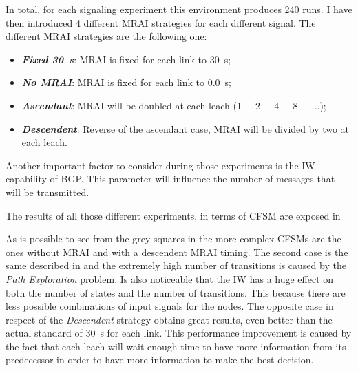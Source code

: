 \begin{table}[h]
	
	\caption{Fabrikant experiments environment}
	\label{tbl:fabrikant_environment}
\end{table}

In total, for each signaling experiment this environment produces \num{240} runs.
I have then introduced \num{4} different \ac{MRAI} strategies for each different
signal.
The different \ac{MRAI} strategies are the following one:
\begin{itemize}
	\item \textbf{\textit{Fixed \SI{30}{\second}}}: \ac{MRAI} is fixed for each link to \SI{30}{\second};
	\item \textbf{\textit{No \ac{MRAI}}}: \ac{MRAI} is fixed for each link to \SI{0.0}{\second};
	\item \textbf{\textit{Ascendant}}: \ac{MRAI} will be doubled at each leach (1 − 2 − 4 − 8 − ...);
	\item \textbf{\textit{Descendent}}: Reverse of the ascendant case, \ac{MRAI} will be divided by two at each leach.
\end{itemize}

Another important factor to consider during those experiments is the \ac{IW}
capability of \ac{BGP}.
This parameter will influence the number of messages
that will be transmitted.

The results of all those different experiments, in terms of \ac{CFSM} are
exposed in 

\begin{table}[h]
	
	\caption{Fabrikant \ac{CFSM}s results, $|S|$ is the dimension of the states set
		$|T|$ is the dimension of the transitions set, The worst results for each
		category are colored in gray, the topology contains \num{3} rings, as
		}
	\label{tbl:fabrikant_cfsm}
\end{table}

As is possible to see from the grey squares in  the more
complex \ac{CFSM}s are the ones without \ac{MRAI} and with a descendent \ac{MRAI}
timing.
The second case is the same described in \cite{fabrikant2011there} and the extremely
high number of transitions is caused by the \textit{Path Exploration} problem.
Is also noticeable that the \ac{IW} has a huge effect on both the number
of states and the number of transitions.
This because there are less possible combinations of input signals for the nodes.
The opposite case in respect of the \textit{Descendent} strategy obtains
great results, even better than the actual standard of \SI{30}{\second} for
each link.
This performance improvement is caused by the fact that each leach will wait
enough time to have more information from its predecessor in order to have
more information to make the best decision.

